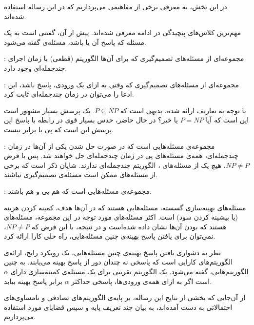 

در این بخش، به معرفی برخی از مفاهیمی می‌پردازیم که در این رساله استفاده شده‌اند.


مهم‌ترین کلاس‌های پیچیدگی در ادامه معرفی شده‌اند. پیش از آن، گفتنی است به یک مسئله که پاسخ آن  یا  باشد، مسئله‌ی  گفته می‌شود.

: مجموعه‌ای از مسئله‌های تصمیم‌گیری که برای آن‌ها الگوریتم (قطعی) با زمان اجرای چند‌جمله‌ای وجود دارد.

: مجموعه‌ای از مسئله‌های تصمیم‌گیری که وقتی به ازای یک ورودی، پاسخ  باشد، این ادعا را می‌توان در زمان چند‌جمله‌ای ثابت کرد.

با توجه به تعاریف ارائه شده، بدیهی است که $P \subseteq NP$. یک پرسش بسیار مشهور است این است که آیا $P = NP$ یا خیر؟ در حال حاضر، حدس بسیار قوی در رابطه با پاسخ این پرسش این است که ‌پی{} با  برابر نیست.

: مجموعه‌ی مسئله‌هایی است که در صورت حل شدن یکی از آن‌ها در زمان چند‌جمله‌ای، همه‌ی مسئله‌های ‌پی{} در زمان چند‌جمله‌ای حل خواهند شد. پس با فرض $NP \neq P$، هیچ یک از مسئله‌های ، الگوریتم چند‌جمله‌ای ندارند. شایان ذکر است که برخی از مسئله‌های  ممکن است مسئله‌ی تصمیم‌گیری نباشند.

: مجموعه‌ی مسئله‌هایی است که هم ‌پی{} و هم  باشند.


مسئله‌های بهینه‌سازی گسسته، مسئله‌هایی هستند که در آن‌ها هدف، کمینه کردن هزینه (یا بیشینه کردن سود) است. اکثر مسئله‌های مورد توجه در این مجموعه، مسئله‌های هستند که  بودن آن‌ها نشان داده شده‌است و در نتیجه، با این فرض که $NP \neq P$، نمی‌توان برای یافتن پاسخ بهینه‌ی چنین مسئله‌هایی، راه حلی کارا ارائه کرد.

نظر به دشواری یافتن پاسخ بهینه‌ی چنین مسئله‌هایی، یک رویکرد رایج، ارائه‌ی الگوریتم‌های کارایی است که پاسخی نه چندان دور از پاسخ بهینه می‌یابند. به چنین الگوریتم‌هایی،  گفته می‌شود. یک الگوریتم تقریبی برای یک مسئله‌ی کمینه‌سازی دارای  $\alpha$ است اگر به ازای همه‌ی ورودی‌ها، پاسخی حد‌اکثر $\alpha$ برابر پاسخ بهینه بیابد.



از آن‌جایی که بخشی از نتایج این رساله، بر پایه‌ی الگوریتم‌های تصادفی و نامساوی‌های احتمالاتی به دست آمده‌اند، به بیان چند تعریف پایه و سپس قضایای مورد استفاده می‌پردازیم.

